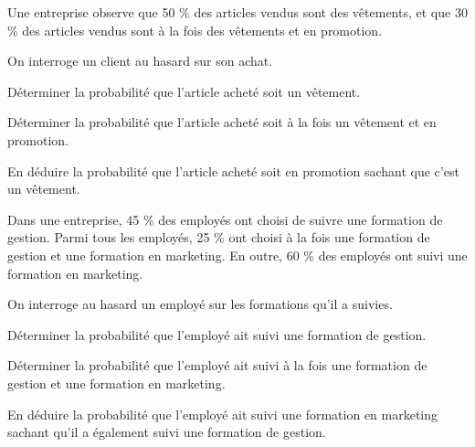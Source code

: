 \documentclass[11pt]{article}
\begin{document}
\begin{exercice}
Une entreprise observe que 50 \% des articles vendus sont des vêtements, et que 30 \% des articles vendus sont à la fois des vêtements et en promotion.

On interroge un client au hasard sur son achat.

\begin{enu}
\item Déterminer la probabilité que l'article acheté soit un vêtement. 
\item Déterminer la probabilité que l'article acheté soit à la fois un vêtement et en promotion.
\item En déduire la probabilité que l'article acheté soit en promotion sachant que c'est un vêtement.
\end{enu}
\end{exercice}

\begin{exercice}
Dans une entreprise, 45 \% des employés ont choisi de suivre une formation de gestion. Parmi tous les employés, 25 \% ont choisi à la fois une formation de gestion et une formation en marketing. En outre, 60 \% des employés ont suivi une formation en marketing.

On interroge au hasard un employé sur les formations qu'il a suivies.

\begin{enu}
\item Déterminer la probabilité que l'employé ait suivi une formation de gestion.
\item Déterminer la probabilité que l'employé ait suivi à la fois une formation de gestion et une formation en marketing.
\item En déduire la probabilité que l'employé ait suivi une formation en marketing sachant qu'il a également suivi une formation de gestion.
\end{enu}
\end{exercice}
\end{document}
